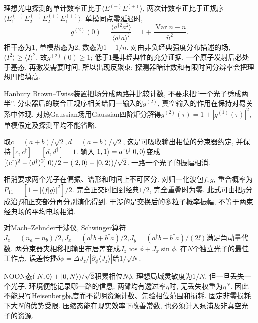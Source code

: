 理想光电探测的单计数率正比于$\langle E^{(-)}E^{(+)}\rangle$, 两次计数率正比于正规序$\langle E_1^{(-)}E_2^{(-)}E_2^{(+)}E_1^{(+)}\rangle$. 单模同点零延迟时,
\[g^{(2)}(0)=\frac{\langle a^{\dagger2}a^2\rangle}{\langle a^\dagger a\rangle^2}=1+\frac{\operatorname{Var}n-\bar n}{\bar n^2}.\]
相干态为1, 单模热态为2, 数态为$1-1/n$. 对由非负经典强度分布描述的场, $\langle I^2\rangle\ge\langle I\rangle^2$, 故$g^{(2)}(0)\ge1$; 低于1是非经典性的充分证据. 一个原子发射后必处于基态, 再激发需要时间, 所以出现反聚束; 探测器暗计数和有限时间分辨率会把理想凹陷填高.

Hanbury Brown--Twiss装置把场分成两路并比较计数, 不要求把“一个光子劈成两半”. 分束器后的联合正规序相关给同一输入的$g^{(2)}$, 真空输入的作用在保持对易关系中体现. 对热Gaussian场用Gaussian四阶矩分解得$g^{(2)}(\tau)=1+|g^{(1)}(\tau)|^2$, 单模假定及探测平均不能省略.

取$c=(a+b)/\sqrt2,d=(a-b)/\sqrt2$, 这是可吸收输出相位的分束器约定, 并保持$[c,c^\dagger]=[d,d^\dagger]=1$. 输入$\lvert 1,1\rangle=a^\dagger b^\dagger\lvert 0,0\rangle$变成$[(c^\dagger)^2-(d^\dagger)^2]\lvert 0\rangle/2=(\lvert 2,0\rangle-\lvert 0,2\rangle)/\sqrt2$. 一路一个光子的振幅相消.

相消要求两个光子在偏振、谱形和时间上不可区分. 对归一化波包$f,g$, 重合概率为$P_{11}=[1-|\langle f|g\rangle|^2]/2$. 完全正交时回到经典$1/2$, 完全重叠时为零. 此式可由把$g$分成沿$f$和正交部分再分别演化得到. 干涉的是交换后的多粒子概率振幅, 不等于两束经典场的平均电场相消.

对Mach--Zehnder干涉仪, Schwinger算符$J_z=(n_a-n_b)/2,J_x=(a^\dagger b+b^\dagger a)/2,J_y=(a^\dagger b-b^\dagger a)/(2\ii)$满足角动量代数. 两分束器夹相移把输出布居差变成$J_z\cos\phi+J_x\sin\phi$. 在$N$个独立光子的最佳工作点, 误差传播$\delta\phi=\Delta J_z/|\partial_\phi\langle J_z\rangle|$给$1/\sqrt N$.

NOON态$(\lvert N,0\rangle+\lvert 0,N\rangle)/\sqrt2$积累相位$N\phi$, 理想局域灵敏度为$1/N$. 但一旦丢失一个光子, 环境便能记录哪一路的信息; 两臂均有透过率$\eta$时, 无丢失权重为$\eta^N$. 因此不能只写Heisenberg标度而不说明资源计数、先验相位范围和损耗. 固定非零损耗下大$N$的优势受限. 压缩态能在现实效率下改善常数, 也必须计入泵浦及非真空光子的资源.
